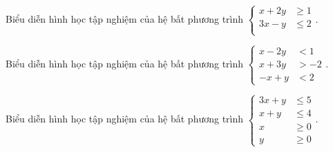 \begin{bt}%
	Biểu diễn hình học tập nghiệm của hệ bất phương trình
	$\left\{\begin{aligned}
		x+2y &\geq 1\\
		3x-y & \leq 2 \\
	\end{aligned}\right.$.
\end{bt}
\begin{bt}%
	Biểu diễn hình học tập nghiệm của hệ bất phương trình
	$\left\{\begin{aligned}
		x-2y &< 1\\
		x+3y &>-2 \\
		-x+y &<2
	\end{aligned}\right.$.
\end{bt}
\begin{bt}%
	Biểu diễn hình học tập nghiệm của hệ bất phương trình
	$\left\{\begin{aligned}
		3x+y & \leq 5\\
		x+y & \leq 4 \\
		x &\geq 0\\
		y &\geq 0
	\end{aligned}\right.$.
\end{bt}

